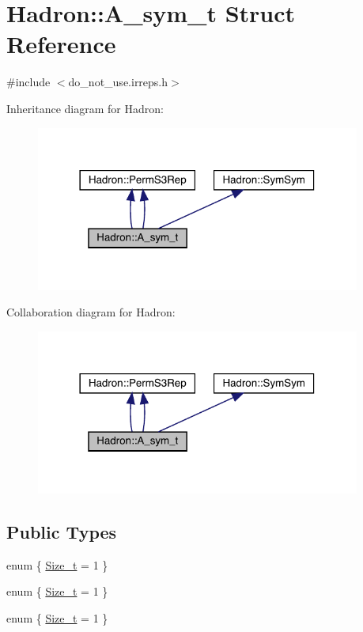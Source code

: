 \hypertarget{structHadron_1_1A__sym__t}{}\section{Hadron\+:\+:A\+\_\+sym\+\_\+t Struct Reference}
\label{structHadron_1_1A__sym__t}


{\ttfamily \#include $<$do\+\_\+not\+\_\+use.\+irreps.\+h$>$}



Inheritance diagram for Hadron\+:\nopagebreak
\begin{figure}[H]
\begin{center}
\leavevmode
\includegraphics[width=302pt]{d3/d65/structHadron_1_1A__sym__t__inherit__graph}
\end{center}
\end{figure}


Collaboration diagram for Hadron\+:\nopagebreak
\begin{figure}[H]
\begin{center}
\leavevmode
\includegraphics[width=302pt]{d3/dd8/structHadron_1_1A__sym__t__coll__graph}
\end{center}
\end{figure}
\subsection*{Public Types}
\begin{DoxyCompactItemize}
\item 
enum \{ \mbox{\hyperlink{structHadron_1_1A__sym__t_a5a96037867b336b490c25161bcd9a2d8a5e8ea0c58f78c23bb8f1eb1c0b9e495f}{Size\+\_\+t}} = 1
 \}
\item 
enum \{ \mbox{\hyperlink{structHadron_1_1A__sym__t_a5a96037867b336b490c25161bcd9a2d8a5e8ea0c58f78c23bb8f1eb1c0b9e495f}{Size\+\_\+t}} = 1
 \}
\item 
enum \{ \mbox{\hyperlink{structHadron_1_1A__sym__t_a5a96037867b336b490c25161bcd9a2d8a5e8ea0c58f78c23bb8f1eb1c0b9e495f}{Size\+\_\+t}} = 1
 \}
\end{DoxyCompactItemize}
